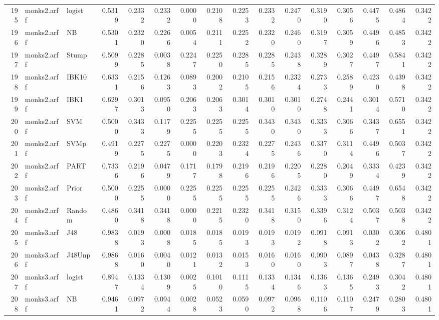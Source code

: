 \documentclass {article}
\begin{document}
\begin{table}[ht]
\begin{tabular}{rllrrrrrrrrrrrrr}
  195 & monks2.arff & logist & 0.5319 & 0.2332 & 0.2332 & 0.0000 & 0.2108 & 0.2253 & 0.2332 & 0.2470 & 0.3190 & 0.3056 & 0.4475 & 0.4864 & 0.3422 \\ 
  196 & monks2.arff & NB & 0.5301 & 0.2320 & 0.2266 & 0.0054 & 0.2111 & 0.2252 & 0.2320 & 0.2460 & 0.3197 & 0.3059 & 0.4496 & 0.4853 & 0.3422 \\ 
  197 & monks2.arff & Stump & 0.5099 & 0.2285 & 0.0038 & 0.2247 & 0.2250 & 0.2285 & 0.2285 & 0.2438 & 0.3289 & 0.3027 & 0.4497 & 0.5841 & 0.3422 \\ 
  198 & monks2.arff & IBK10 & 0.6331 & 0.2156 & 0.1263 & 0.0893 & 0.2002 & 0.2105 & 0.2156 & 0.2324 & 0.2733 & 0.2589 & 0.4230 & 0.4398 & 0.3422 \\ 
  199 & monks2.arff & IBK1 & 0.6297 & 0.3013 & 0.0950 & 0.2063 & 0.2063 & 0.3014 & 0.3010 & 0.3010 & 0.2748 & 0.2441 & 0.3014 & 0.5710 & 0.3422 \\ 
  200 & monks2.arff & SVM & 0.5000 & 0.3433 & 0.1179 & 0.2255 & 0.2255 & 0.2255 & 0.3430 & 0.3430 & 0.3333 & 0.3066 & 0.3437 & 0.6551 & 0.3422 \\ 
  201 & monks2.arff & SVMp & 0.4919 & 0.2275 & 0.2275 & 0.0000 & 0.2203 & 0.2324 & 0.2275 & 0.2436 & 0.3370 & 0.3114 & 0.4496 & 0.5037 & 0.3422 \\ 
  202 & monks2.arff & PART & 0.7336 & 0.2196 & 0.0479 & 0.1717 & 0.1798 & 0.2196 & 0.2196 & 0.2205 & 0.2280 & 0.2049 & 0.3334 & 0.4239 & 0.3422 \\ 
  203 & monks2.arff & Prior & 0.5000 & 0.2255 & 0.0000 & 0.2255 & 0.2255 & 0.2255 & 0.2255 & 0.2426 & 0.3333 & 0.3066 & 0.4497 & 0.6548 & 0.3422 \\ 
  204 & monks2.arff & Random & 0.4860 & 0.3418 & 0.3418 & 0.0000 & 0.2215 & 0.2320 & 0.3418 & 0.3150 & 0.3396 & 0.3124 & 0.5037 & 0.5038 & 0.3422 \\ 
  205 & monks3.arff & J48 & 0.9838 & 0.0193 & 0.0008 & 0.0185 & 0.0185 & 0.0193 & 0.0193 & 0.0192 & 0.0918 & 0.0913 & 0.0302 & 0.3062 & 0.4801 \\ 
  206 & monks3.arff & J48Unp & 0.9868 & 0.0160 & 0.0040 & 0.0121 & 0.0132 & 0.0153 & 0.0160 & 0.0160 & 0.0903 & 0.0897 & 0.0438 & 0.3287 & 0.4801 \\ 
  207 & monks3.arff & logist & 0.8947 & 0.1334 & 0.1309 & 0.0025 & 0.1010 & 0.1115 & 0.1334 & 0.1346 & 0.1363 & 0.1365 & 0.2493 & 0.3042 & 0.4801 \\ 
  208 & monks3.arff & NB & 0.9461 & 0.0972 & 0.0944 & 0.0028 & 0.0523 & 0.0590 & 0.0972 & 0.0968 & 0.1106 & 0.1107 & 0.2479 & 0.2803 & 0.4801 \\ 

\end{tabular}
\end{table}
\end{document}
